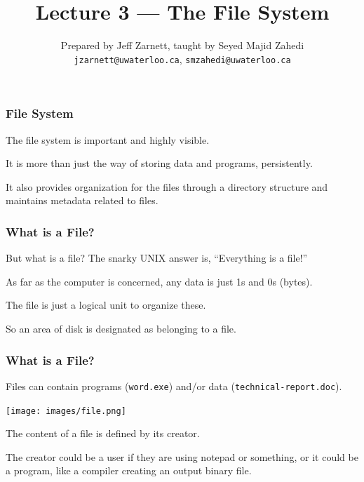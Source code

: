 

\title{Lecture 3 --- The File System }

\author{Prepared by Jeff Zarnett, taught by Seyed Majid Zahedi \\ \small \texttt{jzarnett@uwaterloo.ca}, \texttt{smzahedi@uwaterloo.ca}}
\date{}




\begin{frame}
	\titlepage

\end{frame}



\begin{frame}
	\frametitle{File System}

	The file system is important and highly visible.

	It is more than just the way of storing data and programs, persistently.

	It also provides organization for the files through a directory structure and maintains metadata related to files.

\end{frame}

\begin{frame}
	\frametitle{What is a File?}

	But what is a file? The snarky UNIX answer is, ``Everything is a file!''

	As far as the computer is concerned, any data is just 1s and 0s (bytes).

	The file is just a logical unit to organize these.

	So an area of disk is designated as belonging to a file.

\end{frame}

\begin{frame}
	\frametitle{What is a File?}

	Files can contain programs (\texttt{word.exe}) and/or data (\texttt{technical-report.doc}).

	\begin{center}
		\texttt{[image: images/file.png]}
	\end{center}

	The content of a file is defined by its creator.

	The creator could be a user if they are using notepad or something, or it could be a program, like a compiler creating an output binary file.

\end{frame}

